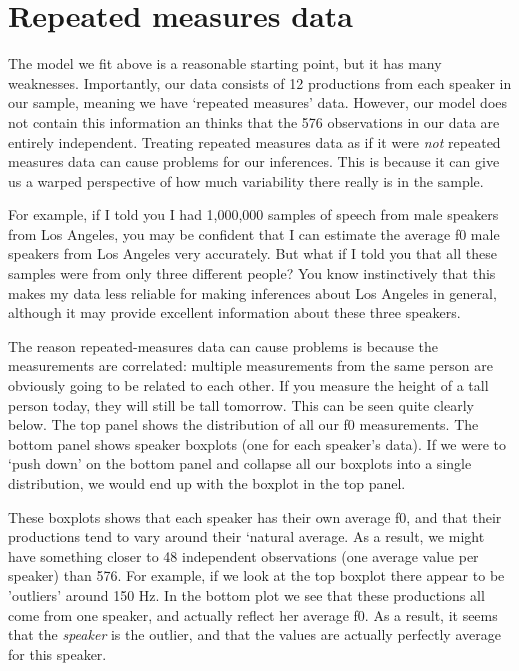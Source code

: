 \documentclass[
]{book}
\begin{document}
\hypertarget{repeated-measures-data}{%
\section{Repeated measures data}\label{repeated-measures-data}}

The model we fit above is a reasonable starting point, but it has many weaknesses. Importantly, our data consists of 12 productions from each speaker in our sample, meaning we have `repeated measures' data. However, our model does not contain this information an thinks that the 576 observations in our data are entirely independent. Treating repeated measures data as if it were \emph{not} repeated measures data can cause problems for our inferences. This is because it can give us a warped perspective of how much variability there really is in the sample.

For example, if I told you I had 1,000,000 samples of speech from male speakers from Los Angeles, you may be confident that I can estimate the average f0 male speakers from Los Angeles very accurately. But what if I told you that all these samples were from only three different people? You know instinctively that this makes my data less reliable for making inferences about Los Angeles in general, although it may provide excellent information about these three speakers.

The reason repeated-measures data can cause problems is because the measurements are correlated: multiple measurements from the same person are obviously going to be related to each other. If you measure the height of a tall person today, they will still be tall tomorrow. This can be seen quite clearly below. The top panel shows the distribution of all our f0 measurements. The bottom panel shows speaker boxplots (one for each speaker's data). If we were to `push down' on the bottom panel and collapse all our boxplots into a single distribution, we would end up with the boxplot in the top panel.

These boxplots shows that each speaker has their own average f0, and that their productions tend to vary around their `natural average. As a result, we might have something closer to 48 independent observations (one average value per speaker) than 576. For example, if we look at the top boxplot there appear to be 'outliers' around 150 Hz. In the bottom plot we see that these productions all come from one speaker, and actually reflect her average f0. As a result, it seems that the \emph{speaker} is the outlier, and that the values are actually perfectly average for this speaker.
\end{document}
